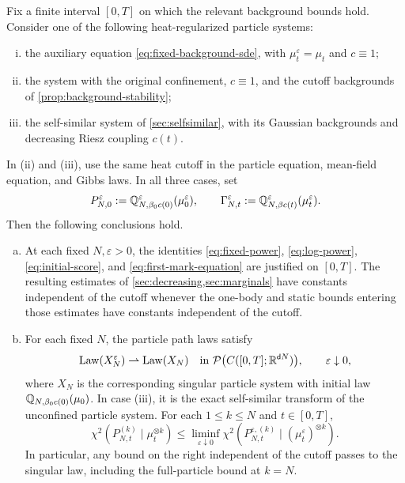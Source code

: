 \documentclass[11pt,reqno]{amsart}
\numberwithin{equation}{section}
\theoremstyle{plain}
\theoremstyle{remark}
\renewcommand{\d}{\mathsf{d}}\newcommand{\s}{\mathsf{s}}
\begin{document}
\begin{lemma}\label{lem:approximation}
Fix a finite interval $[0,T]$ on which the relevant background bounds hold. Consider one of the following heat-regularized particle systems:
\begin{enumerate}[(i)]
\item the auxiliary equation \eqref{eq:fixed-background-sde}, with $\mu_t^\varepsilon=\mu_t$ and $c\equiv1$;
\item the system with the original confinement, $c\equiv1$, and the cutoff backgrounds of \cref{prop:background-stability};
\item the self-similar system of \cref{sec:selfsimilar}, with its Gaussian backgrounds and decreasing Riesz coupling $c(t)$.
\end{enumerate}
In (ii) and (iii), use the same heat cutoff in the particle equation, mean-field equation, and Gibbs laws. In all three cases, set
\begin{equation}\label{eq:approximation-laws}
 P_{N,0}^\varepsilon:=\mathbb Q_{N,\beta_0c(0)}^\varepsilon(\mu_0^\varepsilon),
 \qquad \Gamma_{N,t}^\varepsilon:=\mathbb Q_{N,\beta c(t)}^\varepsilon(\mu_t^\varepsilon).
\end{equation}
Then the following conclusions hold.
\begin{enumerate}[(a)]
\item At each fixed $N,\varepsilon>0$, the identities \eqref{eq:fixed-power}, \eqref{eq:log-power}, \eqref{eq:initial-score}, and \eqref{eq:first-mark-equation} are justified on $[0,T]$. The resulting estimates of \cref{sec:decreasing,sec:marginals} have constants independent of the cutoff whenever the one-body and static bounds entering those estimates have constants independent of the cutoff.
\item For each fixed $N$, the particle path laws satisfy
\begin{equation}\label{eq:approximation-path-laws}
 \operatorname{Law}(X_N^\varepsilon)\rightharpoonup\operatorname{Law}(X_N)
 \quad\text{in }\mathcal P\bigl(C([0,T];\R^{\d N})\bigr),
 \qquad \varepsilon\downarrow0,
\end{equation}
where $X_N$ is the corresponding singular particle system with initial law $\mathbb Q_{N,\beta_0c(0)}(\mu_0)$. In case (iii), it is the exact self-similar transform of the unconfined particle system. For each $1\le k\le N$ and $t\in[0,T]$,
\begin{equation}\label{eq:approximation-square-transfer}
 \chi^2(P_{N,t}^{(k)}\mid\mu_t^{\otimes k})
 \le\liminf_{\varepsilon\downarrow0}
       \chi^2(P_{N,t}^{\varepsilon,(k)}\mid(\mu_t^\varepsilon)^{\otimes k}).
\end{equation}
In particular, any bound on the right independent of the cutoff passes to the singular law, including the full-particle bound at $k=N$.
\end{enumerate}
\end{lemma}
\end{document}
